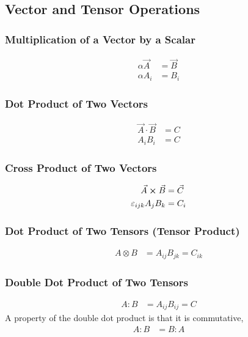 \subsection{Vector and Tensor Operations}
\subsubsection{Multiplication of a Vector by a Scalar}
\begin{align*}
    \alpha \vec{A} &= \vec{B} \\
    \alpha A_i &= B_i
\end{align*}

\subsubsection{Dot Product of Two Vectors}
\begin{align*}
    \vec{A} \cdot \vec{B} &= C \\
    A_i B_i &= C
\end{align*}

\subsubsection{Cross Product of Two Vectors}
\begin{align*}
    \vec{A} \cross \vec{B} &= \vec{C} \\
    \varepsilon_{ijk}A_jB_k &= C_i 
\end{align*}

\subsubsection{Dot Product of Two Tensors (Tensor Product)}
\begin{align*}
    A \otimes B &= A_{ij}B_{jk}= C_{ik}
\end{align*}

\subsubsection{Double Dot Product of Two Tensors}
\begin{align*}
    A : B &= A_{ij}B_{ij} = C
\end{align*}
A property of the double dot product is that it is commutative, 
\begin{align*}
    A : B &= B : A
\end{align*}

